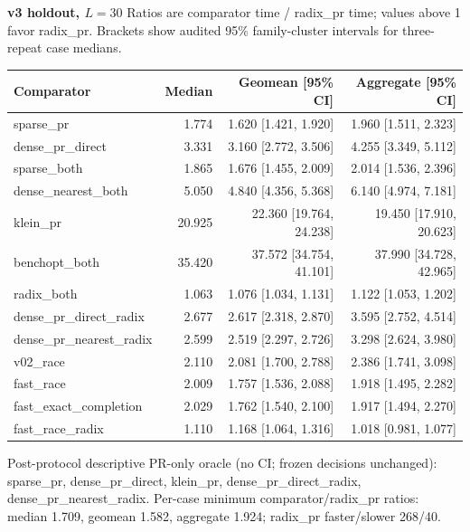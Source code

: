 \par\noindent\textbf{v3 holdout, $L=30$}
Ratios are comparator time / radix\_pr time; values above 1 favor radix\_pr.
Brackets show audited 95\% family-cluster intervals for three-repeat case medians.
\par\smallskip
\begin{tabular}{lrrr}
Comparator & Median & Geomean [95\% CI] & Aggregate [95\% CI] \\
\hline
sparse\_pr & 1.774 & 1.620 [1.421, 1.920] & 1.960 [1.511, 2.323] \\
dense\_pr\_direct & 3.331 & 3.160 [2.772, 3.506] & 4.255 [3.349, 5.112] \\
sparse\_both & 1.865 & 1.676 [1.455, 2.009] & 2.014 [1.536, 2.396] \\
dense\_nearest\_both & 5.050 & 4.840 [4.356, 5.368] & 6.140 [4.974, 7.181] \\
klein\_pr & 20.925 & 22.360 [19.764, 24.238] & 19.450 [17.910, 20.623] \\
benchopt\_both & 35.420 & 37.572 [34.754, 41.101] & 37.990 [34.728, 42.965] \\
radix\_both & 1.063 & 1.076 [1.034, 1.131] & 1.122 [1.053, 1.202] \\
dense\_pr\_direct\_radix & 2.677 & 2.617 [2.318, 2.870] & 3.595 [2.752, 4.514] \\
dense\_pr\_nearest\_radix & 2.599 & 2.519 [2.297, 2.726] & 3.298 [2.624, 3.980] \\
v02\_race & 2.110 & 2.081 [1.700, 2.788] & 2.386 [1.741, 3.098] \\
fast\_race & 2.009 & 1.757 [1.536, 2.088] & 1.918 [1.495, 2.282] \\
fast\_exact\_completion & 2.029 & 1.762 [1.540, 2.100] & 1.917 [1.494, 2.270] \\
fast\_race\_radix & 1.110 & 1.168 [1.064, 1.316] & 1.018 [0.981, 1.077] \\
\end{tabular}
\par\smallskip
Post-protocol descriptive PR-only oracle (no CI; frozen decisions unchanged): sparse\_pr, dense\_pr\_direct, klein\_pr, dense\_pr\_direct\_radix, dense\_pr\_nearest\_radix.
Per-case minimum comparator/radix\_pr ratios: median 1.709, geomean 1.582, aggregate 1.924; radix\_pr faster/slower 268/40.

